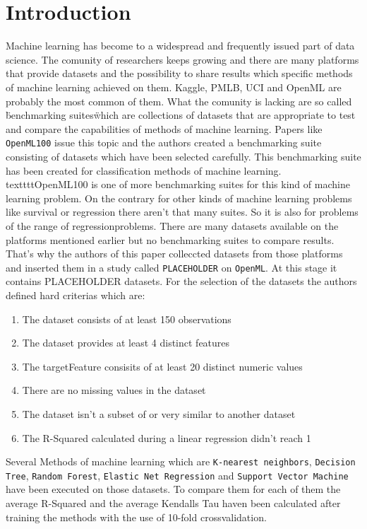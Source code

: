 \documentclass[a4paper]{article}
\begin{document}
\section{Introduction}
Machine learning has become to a widespread and frequently issued part of data science. The comunity of researchers keeps growing and there are many platforms that provide datasets and the possibility to share results which specific methods of machine learning achieved on them. Kaggle, PMLB, UCI and OpenML are probably the most common of them. \newline 
What the comunity is lacking are so called \"benchmarking suites\" which are collections of datasets that are appropriate to test and compare the capabilities of methods of machine learning. 
Papers like \texttt{OpenML100} issue this topic and the authors created a benchmarking suite consisting of datasets which have been selected carefully. This benchmarking suite has been created for classification methods of machine learning. \newline 
textttt{OpenML100} is one of more benchmarking suites for this kind of machine learning problem. \newline 
On the contrary for other kinds of machine learning problems like survival or regression there aren't that many suites. \newline 
So it is also for problems of the range of regressionproblems. There are many datasets available on the platforms mentioned earlier but no benchmarking suites to compare results. That's why the authors of this paper colleccted datasets from those platforms and inserted them in a study called \texttt{PLACEHOLDER} on \texttt{OpenML}. 
At this stage it contains PLACEHOLDER datasets.
For the selection of the datasets the authors defined hard criterias which are: 
\begin{enumerate}
	\item The dataset consists of at least 150 observations 
	\item The dataset provides at least 4 distinct features 
	\item The targetFeature consisits of at least 20 distinct numeric values 
	\item There are no missing values in the dataset 
	\item The dataset isn't a subset of or very similar to another dataset 
	\item The R-Squared calculated during a linear regression didn't reach 1
\end{enumerate}
Several Methods of machine learning which are \texttt{K-nearest neighbors}, \texttt{Decision Tree}, \texttt{Random Forest}, \texttt{Elastic Net Regression} and \texttt{Support Vector Machine} have been executed on those datasets. 
\newline 
To compare them for each of them the average R-Squared and the average Kendalls Tau haven been calculated after training the methods with the use of 10-fold crossvalidation.
\end{document}
